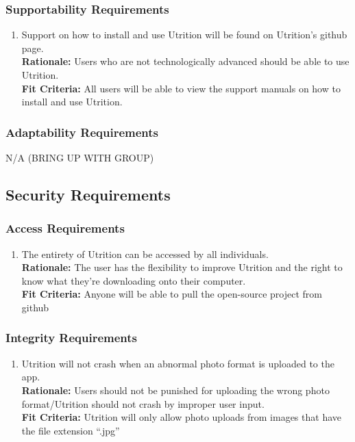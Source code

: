 \documentclass[12pt]{article}
\begin{document}
\subsubsection{Supportability Requirements}
\begin{enumerate}[{MS}2. ] 
	\item Support on how to install and use Utrition will be found on Utrition’s github page. \\
	\textbf{Rationale:} Users who are not technologically advanced should be able to use Utrition.\\	
	\textbf{Fit Criteria:} All users will be able to view the support manuals on how to install and use Utrition.
\end{enumerate}

\subsubsection{Adaptability Requirements}
\hspace{1.5cm}N/A (BRING UP WITH GROUP) 

\subsection{Security Requirements}

\subsubsection{Access Requirements}
\begin{enumerate}[{SR}1. ] 
	\item The entirety of Utrition can be accessed by all individuals. \\
	\textbf{Rationale:} The user has the flexibility to improve Utrition and the right to know what they’re downloading onto their computer.  \\	
	\textbf{Fit Criteria:} Anyone will be able to pull the open-source project from github
\end{enumerate}

\subsubsection{Integrity Requirements}
\begin{enumerate}[{SR}2. ] 
	\item Utrition will not crash when an abnormal photo format is uploaded to the app. \\
	\textbf{Rationale:} Users should not be punished for uploading the wrong photo format/Utrition should not crash by improper user input.\\	
	\textbf{Fit Criteria:}  Utrition will only allow photo uploads from images that have the file extension “.jpg”
\end{enumerate}
\end{document}
